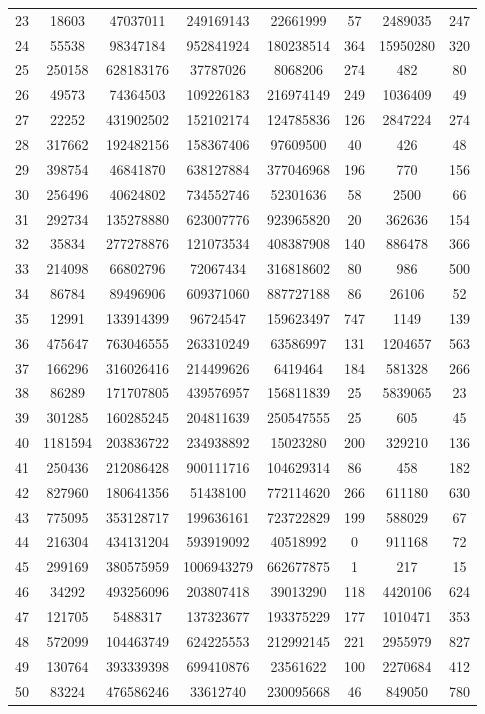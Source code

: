\documentclass[solution, letterpaper]{cs121}
\begin{document}
\begin{center}
\begin{tabular}{ c |c c c c c c c}
23 & 18603 & 47037011 & 249169143 & 22661999 & 57 & 2489035 & 247 \\
24 & 55538 & 98347184 & 952841924 & 180238514 & 364 & 15950280 & 320 \\
25 & 250158 & 628183176 & 37787026 & 8068206 & 274 & 482 & 80 \\
26 & 49573 & 74364503 & 109226183 & 216974149 & 249 & 1036409 & 49 \\
27 & 22252 & 431902502 & 152102174 & 124785836 & 126 & 2847224 & 274 \\
28 & 317662 & 192482156 & 158367406 & 97609500 & 40 & 426 & 48 \\
29 & 398754 & 46841870 & 638127884 & 377046968 & 196 & 770 & 156 \\
30 & 256496 & 40624802 & 734552746 & 52301636 & 58 & 2500 & 66 \\
31 & 292734 & 135278880 & 623007776 & 923965820 & 20 & 362636 & 154 \\
32 & 35834 & 277278876 & 121073534 & 408387908 & 140 & 886478 & 366 \\
33 & 214098 & 66802796 & 72067434 & 316818602 & 80 & 986 & 500 \\
34 & 86784 & 89496906 & 609371060 & 887727188 & 86 & 26106 & 52 \\
35 & 12991 & 133914399 & 96724547 & 159623497 & 747 & 1149 & 139 \\
36 & 475647 & 763046555 & 263310249 & 63586997 & 131 & 1204657 & 563 \\
37 & 166296 & 316026416 & 214499626 & 6419464 & 184 & 581328 & 266 \\
38 & 86289 & 171707805 & 439576957 & 156811839 & 25 & 5839065 & 23 \\
39 & 301285 & 160285245 & 204811639 & 250547555 & 25 & 605 & 45 \\
40 & 1181594 & 203836722 & 234938892 & 15023280 & 200 & 329210 & 136 \\
41 & 250436 & 212086428 & 900111716 & 104629314 & 86 & 458 & 182 \\
42 & 827960 & 180641356 & 51438100 & 772114620 & 266 & 611180 & 630 \\
43 & 775095 & 353128717 & 199636161 & 723722829 & 199 & 588029 & 67 \\
44 & 216304 & 434131204 & 593919092 & 40518992 & 0 & 911168 & 72 \\
45 & 299169 & 380575959 & 1006943279 & 662677875 & 1 & 217 & 15 \\
46 & 34292 & 493256096 & 203807418 & 39013290 & 118 & 4420106 & 624 \\
47 & 121705 & 5488317 & 137323677 & 193375229 & 177 & 1010471 & 353 \\
48 & 572099 & 104463749 & 624225553 & 212992145 & 221 & 2955979 & 827 \\
49 & 130764 & 393339398 & 699410876 & 23561622 & 100 & 2270684 & 412 \\
50 & 83224 & 476586246 & 33612740 & 230095668 & 46 & 849050 & 780 \\
\end{tabular}
\end{center}
\end{document}
